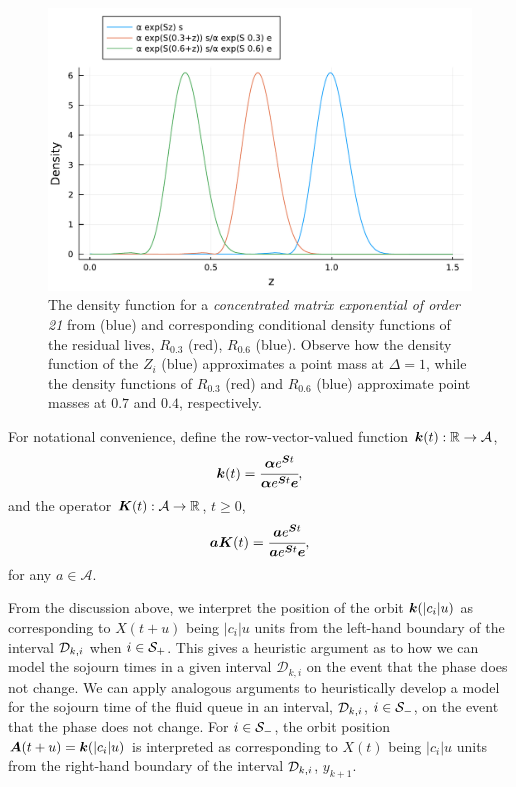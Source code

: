 \begin{figure}
\centering
\includegraphics[width=\textwidth]{chapter3/figs/ME_residual_life_density.pdf}
\caption{The density function for a \emph{concentrated matrix exponential of order 21} from \citep{hht2020} (blue) and corresponding conditional density functions of the residual lives, \(R_{0.3}\) (red), \(R_{0.6}\) (blue). Observe how the density function of the \(Z_i\) (blue) approximates a point mass at \(\Delta=1\), while the density functions of \(R_{0.3}\) (red) and \(R_{0.6}\) (blue) approximate point masses at \(0.7\) and \(0.4\), respectively. }
\label{fig:residual distributions}
\end{figure}

For notational convenience, define the row-vector-valued function \(\boldsymbol k(t):\mathbb R\to \mathcal A\), 
\begin{equation}
	\boldsymbol k(t) = \cfrac{\boldsymbol \alpha e^{\boldsymbol S t}}{\boldsymbol \alpha e^{\boldsymbol S t}\boldsymbol e}, \label{eqn: orbit fun def}
\end{equation}
and the operator \(\boldsymbol K(t): \mathcal A\to \mathbb R\), \(t\geq 0\), 
\begin{equation}
	\boldsymbol a \boldsymbol K(t) = \cfrac{\boldsymbol a e^{\boldsymbol S t}}{\boldsymbol a e^{\boldsymbol S t}\boldsymbol e}, \label{eqn: operator fun def}
\end{equation}
for any \(a\in\mathcal A\). 

From the discussion above, we interpret the position of the orbit \(\boldsymbol k(|c_i|u)\) as corresponding to \(X(t+u)\) being \(|c_i|u\) units from the left-hand boundary of the interval \(\mathcal{D}_{k,i}\) when \(i\in\mathcal{S}_+\). This gives a heuristic argument as to how we can model the sojourn times in a given interval \(\mathcal D_{k,i}\) on the event that the phase does not change. We can apply analogous arguments to heuristically develop a model for the sojourn time of the fluid queue in an interval, \(\mathcal{D}_{k,i}\), \(i\in\mathcal{S}_-\), on the event that the phase does not change. For \(i\in\mathcal{S}_-\), the orbit position \(\boldsymbol A(t+u) = \boldsymbol k(|c_i|u)\) is interpreted as corresponding to \(X(t)\) being \(|c_i|u\) units from the right-hand boundary of the interval \(\mathcal{D}_{k,i}\), \(y_{k+1}\). 

